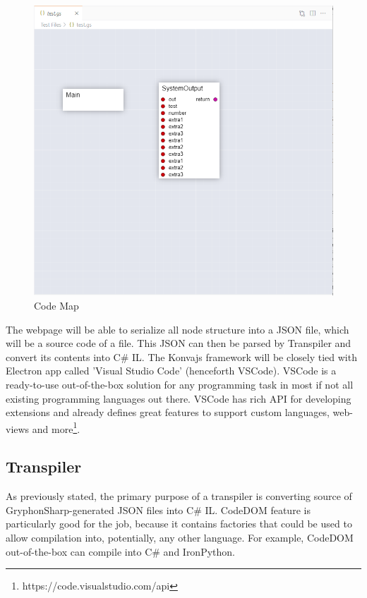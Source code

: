 \documentclass{article}
\begin{document}
\begin{figure}[H]
\centering
\includegraphics[width=1\textwidth]{codemap.PNG}
\caption{Code Map}
\label{fig:codemap}
\end{figure}

The webpage will be able to serialize all node structure into a JSON file, which will be a source code of a file. This JSON can then be parsed by Transpiler and convert its contents into C\# IL.
The Konvajs framework will be closely tied with Electron app called 'Visual Studio Code' (henceforth VSCode). VSCode is a ready-to-use out-of-the-box solution for any programming task in most if not all existing programming languages out there. VSCode has rich API for developing extensions and already defines great features to support custom languages, web-views and more\footnote{https://code.visualstudio.com/api}.
\subsection*{Transpiler}
As previously stated, the primary purpose of a transpiler is converting source of GryphonSharp-generated JSON files into C\# IL. CodeDOM feature is particularly good for the job, because it contains factories that could be used to allow compilation into, potentially, any other language. For example, CodeDOM out-of-the-box can compile into C\# and IronPython.
\end{document}
